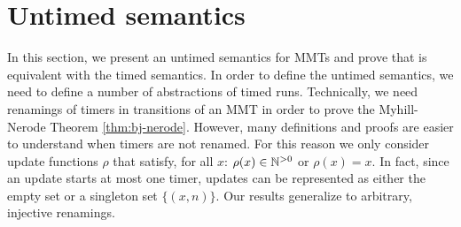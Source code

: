 \section{Untimed semantics}
\label{section untimed semantics}
In this section, we present an untimed semantics for MMTs and prove that is equivalent with the timed semantics.
In order to define the untimed semantics, we need to define a number of abstractions of timed runs.
Technically, we need renamings of timers in transitions of an MMT in order to
prove the Myhill-Nerode Theorem \ref{thm:bj-nerode}. However, many definitions
and proofs are easier to understand when timers are not renamed.
For this reason we only consider update functions $\rho$ that satisfy, 
for all $x$:  $\rho(x) \in{\mathbb N}^{>0}$ or $\rho(x)=x$. In fact, since an update starts
at most one timer, updates can be represented as either the empty set or a singleton set $\{ (x,n) \}$.
Our results generalize to arbitrary, injective renamings.

